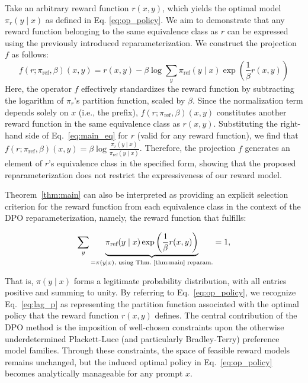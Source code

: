 \begin{sproof}
    Take an arbitrary reward function $r(x, y)$, which yields the optimal model $\pi_r(y \mid x)$ as defined in Eq. \ref{eq:op_policy}. We aim to demonstrate that any reward function belonging to the same equivalence class as $r$ can be expressed using the previously introduced reparameterization. We construct the projection $f$ as follows:
\begin{equation}
    f(r; \pi_\text{ref}, \beta)(x, y) = r(x, y) - \beta\log\sum_{y}\pi_\text{ref}(y\mid x)\exp\left(\frac{1}{\beta}r(x, y)\right)
\end{equation}
Here, the operator $f$ effectively standardizes the reward function by subtracting the logarithm of $\pi_r$'s partition function, scaled by $\beta$. Since the normalization term depends solely on $x$ (i.e., the prefix), $f(r; \pi_\text{ref}, \beta)(x, y)$ constitutes another reward function in the same equivalence class as $r(x, y)$. Substituting the right-hand side of Eq.~\ref{eq:main_eq} for $r$ (valid for any reward function), we find that $f(r; \pi_\text{ref}, \beta)(x, y) = \beta \log \frac{\pi_r(y\mid x)}{\pi_\text{ref}(y\mid x)}$. Therefore, the projection $f$ generates an element of $r$'s equivalence class in the specified form, showing that the proposed reparameterization does not restrict the expressiveness of our reward model.
\end{sproof}

Theorem~\ref{thm:main} can also be interpreted as providing an explicit selection criterion for the reward function from each equivalence class in the context of the DPO reparameterization, namely, the reward function that fulfills:

\begin{equation}\label{eq:lag_p}
     \sum_{y}\underbrace{\pi_\text{ref}(y\mid x)\exp\left(\frac{1}{\beta}r(x, y)\right)}_{=\pi(y\mid x)\text{, using Thm.~\ref{thm:main} reparam.}} = 1,
\end{equation}

That is, $\pi(y\mid x)$ forms a legitimate probability distribution, with all entries positive and summing to unity. By referring to Eq.~\ref{eq:op_policy}, we recognize Eq.~\ref{eq:lag_p} as representing the partition function associated with the optimal policy that the reward function $r(x, y)$ defines. The central contribution of the DPO method is the imposition of well-chosen constraints upon the otherwise underdetermined Plackett-Luce (and particularly Bradley-Terry) preference model families. Through these constraints, the space of feasible reward models remains unchanged, but the induced optimal policy in Eq.~\ref{eq:op_policy} becomes analytically manageable for any prompt $x$.


